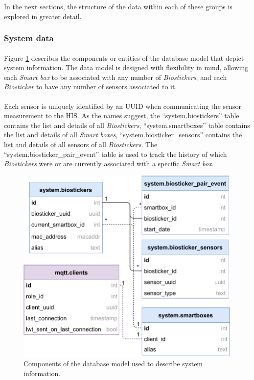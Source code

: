 
In the next sections, the structure of the data within each of these groups is explored in greater detail.

\subsubsection{System data}
\paragraph{} Figure \ref{fig:wow-dbschema-system} describes the components or entities of the database model that depict system information. The data model is designed with flexibility in mind, allowing each \textit{Smart box} to be associated with any number of \textit{Biostickers}, and each \textit{Biosticker} to have any number of sensors associated to it. 

\paragraph{} Each sensor is uniquely identified by an \acs{UUID} when communicating the sensor measurement to the \acs{HIS}. As the names suggest, the ``system.biostickers'' table contains the list and details of all \textit{Biostickers}, ``system.smartboxes'' table contains the list and details of all \textit{Smart boxes}, ``system.biosticker\_sensors'' contains the list and details of all sensors of all \textit{Biostickers}. The ``system.biosticker\_pair\_event'' table is used to track the history of which \textit{Biostickers} were or are currently associated with a specific \textit{Smart box}.

\begin{figure}[H]
    \centering
    \includegraphics[width=0.55\linewidth]{images/database-schema-system.pdf}
    \caption{
    Components of the database model used to describe system information.}
    \label{fig:wow-dbschema-system}
\end{figure}

